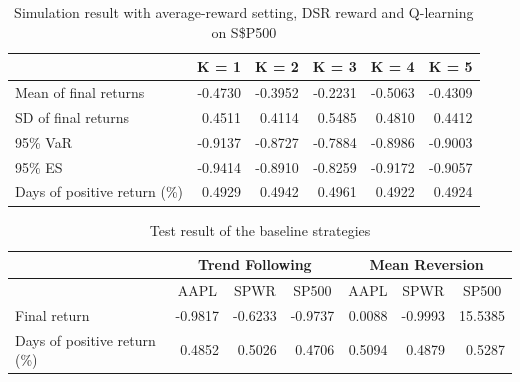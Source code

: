 \documentclass{article}
\begin{document}
\begin{table}[H]
\centering
\begin{tabular}{|l|r|r|r|r|r|} 
\hline
                             & \multicolumn{1}{l|}{K = 1} & \multicolumn{1}{l|}{K = 2} & \multicolumn{1}{l|}{K = 3} & \multicolumn{1}{l|}{K = 4} & \multicolumn{1}{l|}{K = 5}  \\ 
\hline
Mean of final returns        & -0.4730                    & -0.3952                    & -0.2231                    & -0.5063                    & -0.4309                     \\ 
\hline
SD of final returns          & 0.4511                     & 0.4114                     & 0.5485                     & 0.4810                     & 0.4412                      \\ 
\hline
95\% VaR                     & -0.9137                    & -0.8727                    & -0.7884                    & -0.8986                    & -0.9003                     \\ 
\hline
95\% ES                      & -0.9414                    & -0.8910                    & -0.8259                    & -0.9172                    & -0.9057                     \\ 
\hline
Days of positive return (\%) & 0.4929                     & 0.4942                     & 0.4961                     & 0.4922                     & 0.4924                      \\
\hline
\end{tabular}
\caption{Simulation result with average-reward setting, DSR reward and Q-learning on S\$P500}
\label{table24}
\end{table}

\begin{table}[H]
\centering
\begin{tabular}{|l|r|r|r|r|r|r|} 
\hline
                             & \multicolumn{3}{c|}{\textbf{Trend Following}}                                      & \multicolumn{3}{c|}{\textbf{Mean Reversion}}                                        \\ 
\hline
                             & \multicolumn{1}{c|}{AAPL} & \multicolumn{1}{c|}{SPWR} & \multicolumn{1}{c|}{SP500} & \multicolumn{1}{c|}{AAPL} & \multicolumn{1}{c|}{SPWR} & \multicolumn{1}{c|}{SP500}  \\ 
\hline
Final return                 & -0.9817                   & -0.6233                   & -0.9737                    & 0.0088                    & -0.9993                   & 15.5385                     \\ 
\hline
Days of positive return (\%) & 0.4852                    & 0.5026                    & 0.4706                     & 0.5094                    & 0.4879                    & 0.5287                      \\
\hline
\end{tabular}
\caption{Test result of the baseline strategies}
\label{table25}
\end{table}
\end{document}
